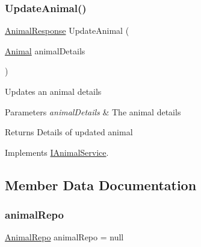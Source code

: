 \subsubsection{\texorpdfstring{Update\+Animal()}{UpdateAnimal()}}
{\footnotesize\ttfamily \hyperlink{classWildLifeTracker_1_1Response_1_1AnimalResponse}{Animal\+Response} Update\+Animal (\begin{DoxyParamCaption}\item[{\hyperlink{classWildLifeTracker_1_1Models_1_1Animal}{Animal}}]{animal\+Details }\end{DoxyParamCaption})\hspace{0.3cm}{\ttfamily [inline]}}



Updates an animal details 


\begin{DoxyParams}{Parameters}
{\em animal\+Details} & The animal details\\
\hline
\end{DoxyParams}
\begin{DoxyReturn}{Returns}
Details of updated animal
\end{DoxyReturn}


Implements \hyperlink{interfaceWildLifeTracker_1_1Services_1_1IAnimalService_a993d3155da89897e5403799432be158b}{I\+Animal\+Service}.



\subsection{Member Data Documentation}
\mbox{\label{classWildLifeTracker_1_1Services_1_1AnimalService_aead7289ee5f2ad9a13ff6b43698a76bb}} 
\subsubsection{\texorpdfstring{animal\+Repo}{animalRepo}}
{\footnotesize\ttfamily \hyperlink{classWildLifeTracker_1_1Repository_1_1AnimalRepo}{Animal\+Repo} animal\+Repo = null\hspace{0.3cm}{\ttfamily [private]}}

